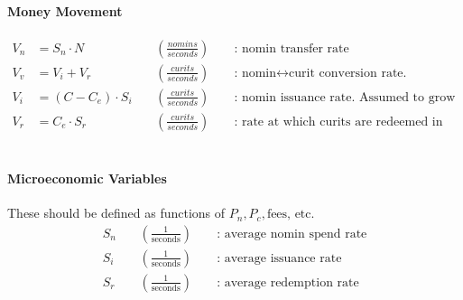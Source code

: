 \documentclass{article}
\begin{document}
\paragraph{Money Movement}
\begin{align*}
    V_n &= S_n \cdot N \ && (\frac{nomins}{seconds}) && \text{ : nomin transfer rate} \\
    V_v &= V_i + V_r \ && (\frac{curits}{seconds}) && \text{ : nomin} \leftrightarrow \text{curit conversion rate.} \\
    V_i &= (C - C_e) \cdot S_i \ && (\frac{curits}{seconds}) && \text{ : nomin issuance rate. Assumed to grow as there are more free curits in the system (actually should probably grow with the number of escrowed but unissued nomins).} \\
    V_r &= C_e \cdot S_r \ && (\frac{curits}{seconds}) && \text{ : rate at which curits are redeemed in return for nomins (which are burned). Assumed to grow proportionally with the number of escrowed curits.}
\end{align*}
\\

\paragraph{Microeconomic Variables} These should be defined as functions of \(P_n, P_c, \text{fees, etc.}\)
\begin{align*}
S_n \ && (\frac{1}{\text{seconds}}) && \text{ : average nomin spend rate} \\
S_i \ && (\frac{1}{\text{seconds}}) && \text{ : average issuance rate} \\
S_r \ && (\frac{1}{\text{seconds}}) && \text{ : average redemption rate}
\end{align*}
\end{document}
